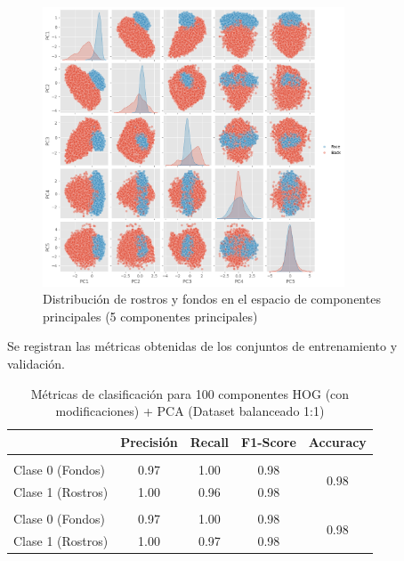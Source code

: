 \documentclass{article}
\begin{document}
\begin{figure}[H]
    \centering
    \includegraphics[width=0.8\textwidth]{tarea_4/imagenes/pairplot_cambios_hog_x1_v1_20.png}
    \caption{Distribución de rostros y fondos en el espacio de componentes principales (5 componentes principales)}
    \label{fig:pca_classes}
\end{figure}

Se registran las métricas obtenidas de los conjuntos de entrenamiento y validación.

\begin{table}[H]
    \centering
    \begin{tabular}{|>{\centering\arraybackslash}m{3.2cm}|c|c|c|c|}
    \hline
    \rowcolor{tableblue} \multicolumn{1}{|c|}{\textbf{Conjunto}} & \textbf{Precisión} & \textbf{Recall} & \textbf{F1-Score} & \textbf{Accuracy} \\
    \hline
    \multicolumn{5}{|c|}{\textbf{Entrenamiento}} \\
    \hline
    Clase 0 (Fondos) & 0.97 & 1.00 & 0.98 & \multirow{2}{*}{0.98} \\
    Clase 1 (Rostros) & 1.00 & 0.96 & 0.98 & \\
    \hline
    \multicolumn{5}{|c|}{\textbf{Validación}} \\
    \hline
    Clase 0 (Fondos) & 0.97 & 1.00 & 0.98 & \multirow{2}{*}{0.98} \\
    Clase 1 (Rostros) & 1.00 & 0.97 & 0.98 & \\
    \hline
    \end{tabular}
    \caption{Métricas de clasificación para 100 componentes HOG (con modificaciones) + PCA (Dataset balanceado 1:1)}
    \label{tab:hog_pca_x1_metrics}
\end{table}
\end{document}

